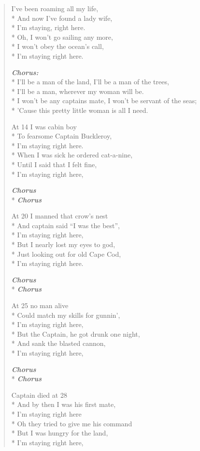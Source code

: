 \documentclass[9pt,twoside]{extarticle}
\makeatletter
\newenvironment{xverse}{
	\begin{verse}
	\fontsize{8.5}{10.5}\selectfont
}{
	\end{verse}
}
\newcommand{\chorusdef}{\textbf{\emph{Chorus:}}\\*}
\newcommand{\chorus@mark}[1][1]{%
\textbf{\emph{Chorus \ifthenelse{\equal{#1}{1}}{}{$\times$ #1}}}%
}
\newcommand{\chorusmark}[1][1]{%
\ifvmode%
\vspace{-0.5\stanzaskip}%
\chorus@mark[#1]%
\vspace{-0.5\stanzaskip}%
\else \\*%
\chorus@mark[#1]%
\fi%
}
\makeatother
\begin{document}
\begin{xverse}
I’ve been roaming all my life, \\*
And now I’ve found a lady wife, \\*
I’m staying, right here. \\*
Oh, I won’t go sailing any more, \\*
I won’t obey the ocean’s call, \\*
I’m staying right here.

\chorusdef
I’ll be a man of the land, I’ll be a man of the trees, \\*
I’ll be a man, wherever my woman will be. \\*
I won’t be any captains mate, I won’t be servant of the seas; \\*
’Cause this pretty little woman is all I need.

At 14 I was cabin boy \\*
To fearsome Captain Buckleroy, \\*
I’m staying right here. \\*
When I was sick he ordered cat-a-nine, \\*
Until I said that I felt fine, \\*
I’m staying right here,

\chorusmark

At 20 I manned that crow’s nest \\*
And captain said “I was the best”, \\*
I’m staying right here, \\*
But I nearly lost my eyes to god, \\*
Just looking out for old Cape Cod, \\*
I’m staying right here.

\chorusmark

At 25 no man alive \\*
Could match my skills for gunnin’, \\*
I’m staying right here, \\*
But the Captain, he got drunk one night, \\*
And sank the blasted cannon, \\*
I’m staying right here,

\chorusmark

Captain died at 28 \\*
And by then I was his first mate, \\*
I’m staying right here \\*
Oh they tried to give me his command \\*
But I was hungry for the land, \\*
I’m staying right here,


\end{xverse}
\end{document}
